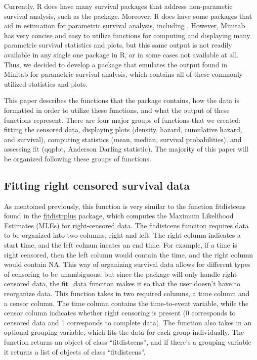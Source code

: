 Currently, R does have many survival packages that address non-parametic
survival analysis, such as the  package. Moreover, R does
have some packages that aid in estimation for parametric survival
analysis, including . However, Minitab has very
concise and easy to utilize functions for computing and displaying many
parametric survival statistics and plots, but this same output is not
readily available in any single one package in R, or in some cases not
available at all. Thus, we decided to develop a package that emulates
the output found in Minitab for parametric survival analysis, which
contains all of these commonly utilized statistics and plots.

This paper describes the functions that the  package
contains, how the data is formatted in order to utilize these functions,
and what the output of these functions represent. There are four major
groups of functions that we created: fitting the censored data,
displaying plots (density, hazard, cumulative hazard, and survival),
computing statistics (mean, median, survival probabilities), and
assessing fit (qqplot, Anderson Darling statistic). The majority of this
paper will be organized following these groups of functions.

\hypertarget{fitting-right-censored-survival-data}{%
\subsection{Fitting right censored survival
data}\label{fitting-right-censored-survival-data}}

As mentoined previously, this function is very similar to the function
fitdistcens found in the
\href{https://cran.r-project.org/web/packages/fitdistrplus/index.html}{fitdistrplus}
package, which computes the Maximum Likelihood Estimates (MLEs) for
right-censored data. The fitdistcens funciton requires data to be
organized into two columns, right and left. The right column indicates a
start time, and the left colmun incates an end time. For example, if a
time is right censored, then the left column would contain the time, and
the right column would contain NA. This way of organizing survival data
allows for different types of censoring to be unambiguous, but since the
 package will only handle right censored data, the
fit\_data funciton makes it so that the user doesn't have to reorganize
data. This function takes in two required columns, a time column and a
censor column. The time column contains the time-to-event variable,
while the censor column indicates whether right censoring is present (0
corresponds to censored data and 1 corresponds to complete data). The
function also takes in an optional grouping variable, which fits the
data for each group individually. The function returns an object of
class ``fitdistcens'', and if there's a grouping variable it returns a
list of objects of class ``fitdistcens''.

